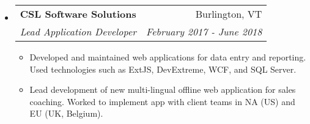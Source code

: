 \documentclass[letterpaper,12pt]{article}
\makeatletter
\newcommand{\resitem}[1]{\item #1 \vspace{-2pt}}
\newcommand{\ressubheading}[4]{
\begin{tabular*}{6.5in}{l@{\extracolsep{\fill}}r}
		\textbf{#1} & #2 \\
		\textit{#3} & \textit{#4} \\
\end{tabular*}\vspace{-6pt}}
\makeatother
\begin{document}
\begin{itemize}
\begin{itemize}
		
		
		
		
		
	\end{itemize}

\item
	\ressubheading{CSL Software Solutions}{Burlington, VT}{Lead Application Developer}{February 2017 - June 2018}
	\begin{itemize}
		
		\resitem{Developed and maintained web applications for data entry and reporting. Used technologies such as ExtJS, DevExtreme, WCF, and SQL Server.}
		
		
		
		
		
		
		
		\resitem{Lead development of new multi-lingual offline web application for sales coaching. Worked to implement app with client teams in NA (US) and EU (UK, Belgium).}
		
		
	\end{itemize}


\end{itemize}
\end{document}
